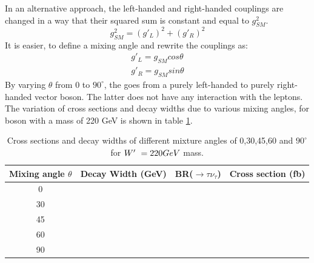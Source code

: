 In an alternative approach, the left-handed and right-handed couplings are changed in a way that their squared sum is constant and equal to $g_{SM}^2$.
\begin{equation}
g_{SM}^2 = (g'_L)^2 +  (g'_R)^2 
\end{equation}
It is easier, to define a mixing angle and rewrite the couplings as:
\begin{eqnarray}
g'_L  = g_{SM} cos\theta \\
g'_R  = g_{SM} sin\theta
\end{eqnarray}
By varying $\theta$ from 0 to $ 90^\circ $, the \wprime goes from a purely left-handed to purely right-handed vector boson. The latter \wprime does not have any interaction with the leptons. 
The variation of cross sections and decay widths due to various mixing angles, for \wprime boson with a mass of 220 GeV is shown in table \ref{tab:mixingAngle}.
\begin{table}[htb]
	\centering
	\begin{tabular}{|c|c|c|c|}
		\hline 
		Mixing angle $\theta$  &  Decay Width (GeV) & BR(\wprime $\rightarrow \tau \nu_\tau$)  &  Cross section (fb)\\
		\hline 
		0      &          &          & \\
		30      &          &          & \\
		45      &          &          & \\
		60      &          &          & \\
		90      &          &          & \\
		\hline
	\end{tabular}
	\caption{Cross sections and decay widths of different mixture angles of 0,30,45,60 and $90^\circ$ for $W^\prime~ =220 GeV$ mass. \label{tab:mixingAngle} }
\end{table}


